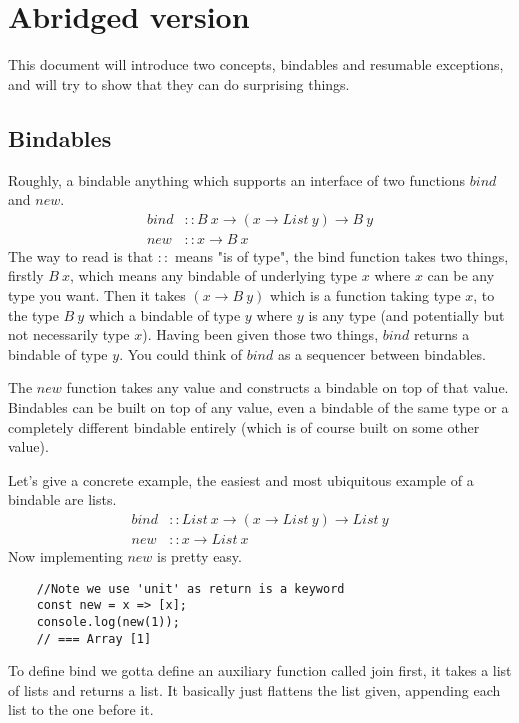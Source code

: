 \section{Abridged version}
This document will introduce two concepts,
bindables and resumable exceptions,
and will try to show that they can do surprising things.

\subsection{Bindables}
Roughly, a bindable anything which supports an
interface of two functions $bind$ and $new$.
\begin{align}
    bind &:: B\ x \rightarrow (x \rightarrow List\ y) \rightarrow B\ y\\
    new &:: x \rightarrow B\ x
\end{align}
The way to read is that $::$ means "is of type",
the bind function takes two things,
firstly $B\ x$, which means any bindable of underlying type $x$
where $x$ can be any type you want.
Then it takes $(x \rightarrow B\ y)$ which
is a function taking type $x$,
to the type $B\ y$ which a bindable of type $y$
where $y$ is any type
(and potentially but not necessarily type $x$).
Having been given those two things,
$bind$ returns a bindable of type $y$.
You could think of $bind$ as a sequencer between bindables.

The $new$ function takes any value and
constructs a bindable on top of that value.
Bindables can be built on top of any value,
even a bindable of the same type
or a completely different bindable entirely
(which is of course built on some other value).

Let's give a concrete example,
the easiest and most ubiquitous example of a bindable are lists.
\begin{align}
    bind &:: List\ x \rightarrow (x \rightarrow List\ y) \rightarrow List\ y\\
    new &:: x \rightarrow List\ x
\end{align}
Now implementing $new$ is pretty easy.
\begin{verbatim}
    //Note we use 'unit' as return is a keyword
    const new = x => [x];
    console.log(new(1));
    // === Array [1]
\end{verbatim}

To define bind we gotta define an auxiliary function called join first,
it takes a list of lists and returns a list.
It basically just flattens the list given,
appending each list to the one before it.

